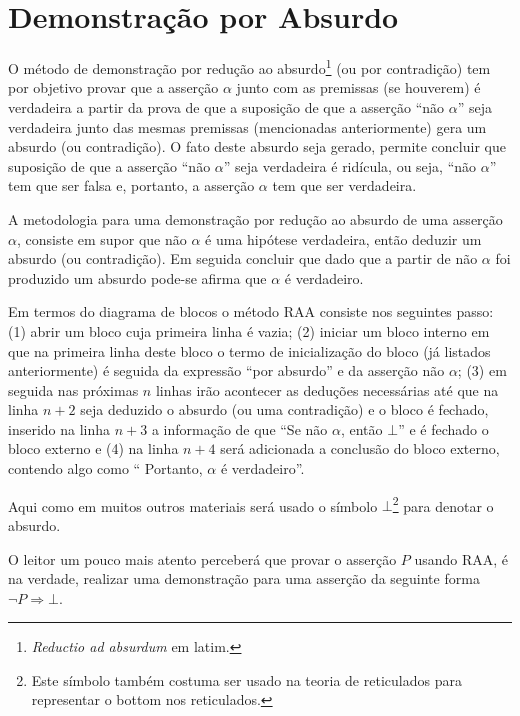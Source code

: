 \section{Demonstração por Absurdo}\label{sec:DemonstracaoAbsurdo}

O método de demonstração por redução ao absurdo\footnote{\textit{Reductio ad absurdum} em latim.} (ou por contradição) tem por objetivo provar que a asserção $\alpha$ junto com as premissas (se houverem) é verdadeira a partir da prova de que a suposição de que a asserção ``não $\alpha$'' seja verdadeira junto das mesmas premissas (mencionadas anteriormente) gera um absurdo (ou contradição). O fato deste absurdo seja gerado, permite concluir que suposição de que a asserção ``não $\alpha$'' seja verdadeira é ridícula, ou seja, ``não $\alpha$'' tem que ser falsa e, portanto, a asserção $\alpha$ tem que ser verdadeira. 

\begin{definicao}
	A metodologia para uma demonstração por redução ao absurdo de uma asserção $\alpha$, consiste em supor que não $\alpha$ é uma hipótese verdadeira, então deduzir um absurdo (ou contradição). Em seguida concluir que dado que a partir de não $\alpha$ foi produzido um absurdo pode-se afirma que $\alpha$ é verdadeiro.
\end{definicao}

Em termos do diagrama de blocos o método RAA consiste nos seguintes passo: (1) abrir um bloco  cuja primeira linha é vazia; (2) iniciar um bloco interno em que na primeira linha deste bloco o termo de inicialização do bloco (já listados anteriormente) é seguida da expressão ``por absurdo'' e da asserção não $\alpha$; (3) em seguida nas próximas $n$ linhas irão acontecer as deduções necessárias até que na linha $n+2$ seja deduzido o absurdo (ou uma contradição) e o bloco é fechado, inserido na linha $n +3$ a informação de que ``Se não $\alpha$, então $\bot$'' e é fechado o bloco externo e (4) na linha $n + 4$ será adicionada a conclusão do bloco externo, contendo algo como `` Portanto, $\alpha$ é verdadeiro''.

\begin{nota}
  Aqui como em muitos outros materiais será usado o símbolo $\bot$\footnote{Este símbolo também costuma ser usado na teoria de reticulados para representar o bottom nos reticulados.} para denotar o absurdo.
\end{nota}

\begin{nota}
  O leitor um pouco mais atento perceberá que provar o asserção $P$ usando RAA, é na verdade, realizar uma demonstração para uma asserção da seguinte forma $\neg P \Rightarrow \bot$.
\end{nota}


